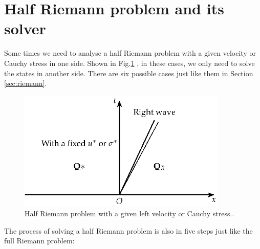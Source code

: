 \documentclass[review]{elsarticle}
\begin{document}
%
%
%
\section{Half Riemann problem and its solver}
Some times we need to analyse a half Riemann problem with a given velocity or Cauchy stress in one side. Shown in Fig.\ref{fig:half} , in these cases, we only need to solve the states in another side. There are six possible cases just like them in Section \ref{sec:riemann}.

\begin{figure}
  \centering
  \includegraphics[width= 10cm] {Tikz-figure8.eps}
  \caption{Half Riemann problem  with a given left velocity or Cauchy stress..}
  \label{fig:half}
\end{figure}

The process of solving a half Riemann problem is also in five steps just like the full Riemann problem:
\end{document}
